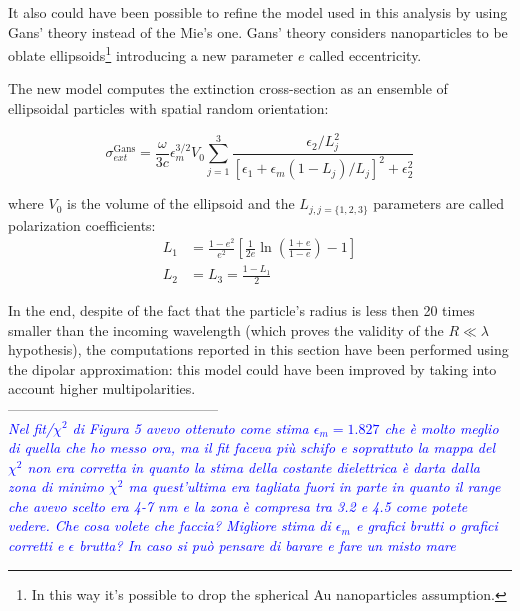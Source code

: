 \documentclass[twocolumn]{article}
\newcommand{\gio}[1]{\textcolor{blue}{\textit{#1}}}
\begin{document}
\begin{multicols}{2}

It also could have been possible to refine the model used in this analysis by using Gans' theory instead of the Mie's one. Gans' theory considers nanoparticles to be oblate ellipsoids\footnote{In this way it's possible to drop the spherical Au nanoparticles assumption.} introducing a new parameter $e$ called eccentricity.

\noindent
The new model computes the extinction cross-section as an ensemble of ellipsoidal particles with spatial random orientation:

\begin{equation*}
\sigma_{ext}^{\text{Gans}} = \frac{\omega}{3c} \epsilon_m^{3/2}V_{0} \sum^{3}_{j=1}{\frac{\epsilon_2/L_j^2}{[\epsilon_1 + \epsilon_m(1-L_j)/L_j]^2 + \epsilon_2^2}}
\end{equation*}

\noindent
where $V_0$ is the volume of the ellipsoid and the $L_{j,j=\{1,2,3\}}$ parameters are called polarization coefficients:
\begin{align*}
L_{1}&=\frac{1-e^{2}}{e^{2}}\left[\frac{1}{2 e} \ln \left(\frac{1+e}{1-e}\right)-1\right]\\
L_{2}&=L_{3}=\frac{1-L_{1}}{2}
\end{align*}

In the end, despite of the fact that the particle's radius is less then 20 times smaller than the incoming wavelength (which proves the validity of the $R\ll \lambda$ hypothesis), the computations reported in this section have been performed  using the dipolar approximation: this model could have been improved by taking into account higher multipolarities.  \\

--------------------------------------------- \\

\gio{Nel fit/$\chi^2$ di Figura 5 avevo ottenuto come stima $\epsilon_m=1.827$ che è molto meglio di quella che ho messo ora, ma il fit faceva più schifo e soprattuto la mappa del $\chi^2$ non era corretta in quanto la stima della costante dielettrica è darta dalla zona di minimo $\chi^2$ ma quest'ultima era tagliata fuori in parte in quanto il range che avevo scelto era 4-7 nm e la zona è compresa tra 3.2 e 4.5 come potete vedere. Che cosa volete che faccia? Migliore stima di $\epsilon_m$ e grafici brutti o grafici corretti e $\epsilon$ brutta? In caso si può pensare di barare e fare un misto mare }


\end{multicols}
\end{document}
